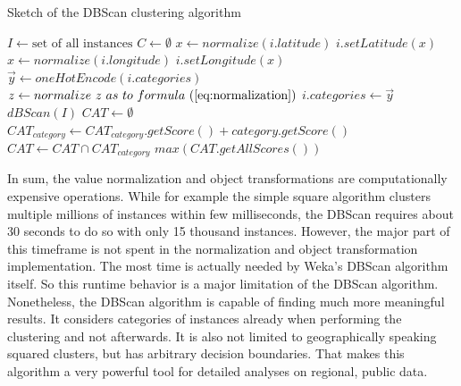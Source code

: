 \begin{algorithm}
\caption{Sketch of the DBScan clustering algorithm}\label{alg:dbscan}
\begin{algorithmic} 
\STATE $I \gets \text{set~of~all~instances}$
\STATE $C \gets \emptyset$
\STATE $x \gets normalize(i.latitude)$
\STATE $i.setLatitude(x)$
\STATE $x \gets normalize(i.longitude)$
\STATE $i.setLongitude(x)$
\STATE $\vec{y} \gets oneHotEncode(i.categories)$
\STATE $z \gets normalize~z~as~to~formula~(\ref{eq:normalization})$
\ENDFOR
\STATE $i.categories \gets \vec{y}$
\ENDFOR
\STATE $dBScan(I)$
\STATE ${CAT} \gets \emptyset$
\STATE ${CAT}_{category} \gets {CAT}_{category}.getScore() + category.getScore()$
\STATE ${CAT} \gets {CAT} \cap {CAT}_{category}$
\ENDFOR
\ENDFOR
\RETURN $max({CAT}.getAllScores())$
\end{algorithmic}
\end{algorithm}

In sum, the value normalization and object transformations are computationally expensive operations. While for example the simple square algorithm clusters multiple millions of instances within few milliseconds, the DBScan requires about 30 seconds to do so with only 15 thousand instances. However, the major part of this timeframe is not spent in the normalization and object transformation implementation. The most time is actually needed by Weka’s DBScan algorithm itself. So this runtime behavior is a major limitation of the DBScan algorithm. Nonetheless, the DBScan algorithm is capable of finding much more meaningful results. It considers categories of instances already when performing the clustering and not afterwards. It is also not limited to geographically speaking squared clusters, but has arbitrary decision boundaries. That makes this algorithm a very powerful tool for detailed analyses on regional, public data.

